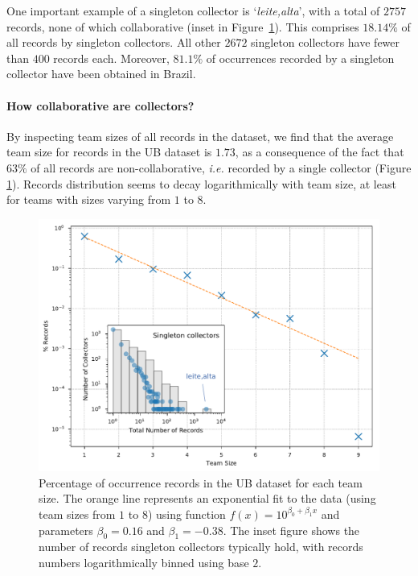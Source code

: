 One important example of a singleton collector is `\textit{leite,alta}', with a total of $2757$ records, none of which collaborative (inset in Figure~\ref{fig:ub_team_sizes}).  %
This comprises $18.14\%$ of all records by singleton collectors.
All other $2672$ singleton collectors have fewer than $400$ records each.
Moreover, $81.1\%$ of occurrences recorded by a singleton collector have been obtained in Brazil.



\paragraph*{How collaborative are collectors?}

By inspecting team sizes of all records in the dataset, we find that the average team size for records in the UB dataset is $1.73$, as a consequence of the fact that $63\%$ of all records are non-collaborative, \textit{i.e.} recorded by a single collector (Figure \ref{fig:ub_team_sizes}).
%
Records distribution seems to decay logarithmically with team size, at least for teams with sizes varying from $1$ to $8$.
\begin{figure}[!h]
  	\centering
    \includegraphics[width=0.9\linewidth]{figures/casestudy_ub/team_sizes.pdf}
    \caption{ Percentage of occurrence records in the UB dataset for each team size. The orange line represents an exponential fit to the data (using team sizes from $1$ to $8$) using function $f(x) = 10^{\beta_0 + \beta_1 x}$ and parameters $\beta_0=0.16$ and $\beta_1=-0.38$. The inset figure shows the number of records singleton collectors typically hold, with records numbers logarithmically binned using base $2$. }
    \label{fig:ub_team_sizes}
\end{figure}

